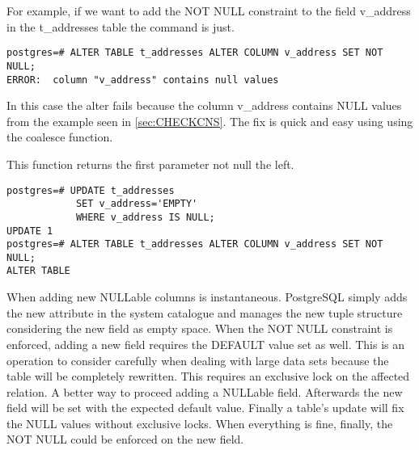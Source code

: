For example, if we want to add the NOT NULL constraint to the field v\_address in the t\_addresses 
table the command is just.

\begin{lstlisting}[style=pgsql]
postgres=# ALTER TABLE t_addresses ALTER COLUMN v_address SET NOT NULL;
ERROR:  column "v_address" contains null values

\end{lstlisting}

In this case the alter fails because the column v\_address contains NULL values from the example 
seen in \ref{sec:CHECKCNS}. The fix is quick and easy using using the coalesce function.\newline

This function returns the first parameter not null the left. 

\begin{lstlisting}[style=pgsql]
postgres=# UPDATE t_addresses
            SET v_address='EMPTY'
            WHERE v_address IS NULL;
UPDATE 1
postgres=# ALTER TABLE t_addresses ALTER COLUMN v_address SET NOT NULL;
ALTER TABLE

\end{lstlisting}

When adding new NULLable columns is instantaneous. PostgreSQL simply adds the new attribute in the
system catalogue and manages the new tuple structure considering the new field as empty space.
When the NOT NULL constraint is enforced, adding a new field requires the DEFAULT value set as well. This
is an operation to consider carefully when dealing with large data sets because the table will be
completely rewritten. This requires an exclusive lock on the affected relation. A better way to proceed
adding a NULLable field. Afterwards the new field will be set with the expected default value. Finally a
table's update will fix the NULL values without exclusive locks. When everything is fine, finally, the
NOT NULL could be enforced on the new field.